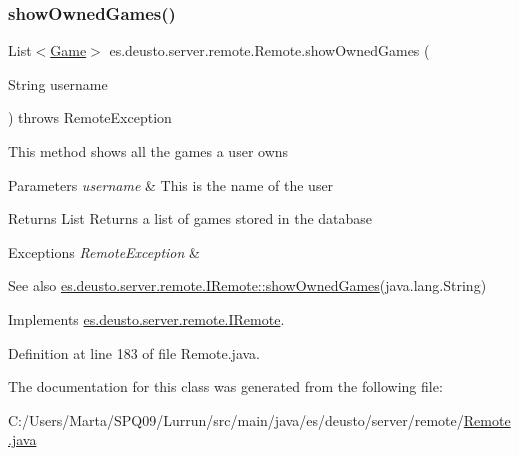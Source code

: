 \subsubsection{\texorpdfstring{show\+Owned\+Games()}{showOwnedGames()}}
{\footnotesize\ttfamily List$<$\hyperlink{classes_1_1deusto_1_1server_1_1db_1_1data_1_1_game}{Game}$>$ es.\+deusto.\+server.\+remote.\+Remote.\+show\+Owned\+Games (\begin{DoxyParamCaption}\item[{String}]{username }\end{DoxyParamCaption}) throws Remote\+Exception}

This method shows all the games a user owns 
\begin{DoxyParams}{Parameters}
{\em username} & This is the name of the user \\
\hline
\end{DoxyParams}
\begin{DoxyReturn}{Returns}
List Returns a list of games stored in the database 
\end{DoxyReturn}

\begin{DoxyExceptions}{Exceptions}
{\em Remote\+Exception} & \\
\hline
\end{DoxyExceptions}
\begin{DoxySeeAlso}{See also}
\hyperlink{interfacees_1_1deusto_1_1server_1_1remote_1_1_i_remote_aaaf6af5906c81cbd7b3b190a70ead98b}{es.\+deusto.\+server.\+remote.\+I\+Remote\+::show\+Owned\+Games}(java.\+lang.\+String) 
\end{DoxySeeAlso}


Implements \hyperlink{interfacees_1_1deusto_1_1server_1_1remote_1_1_i_remote_aaaf6af5906c81cbd7b3b190a70ead98b}{es.\+deusto.\+server.\+remote.\+I\+Remote}.



Definition at line 183 of file Remote.\+java.



The documentation for this class was generated from the following file\+:\begin{DoxyCompactItemize}
\item 
C\+:/\+Users/\+Marta/\+S\+P\+Q09/\+Lurrun/src/main/java/es/deusto/server/remote/\hyperlink{_remote_8java}{Remote.\+java}\end{DoxyCompactItemize}
